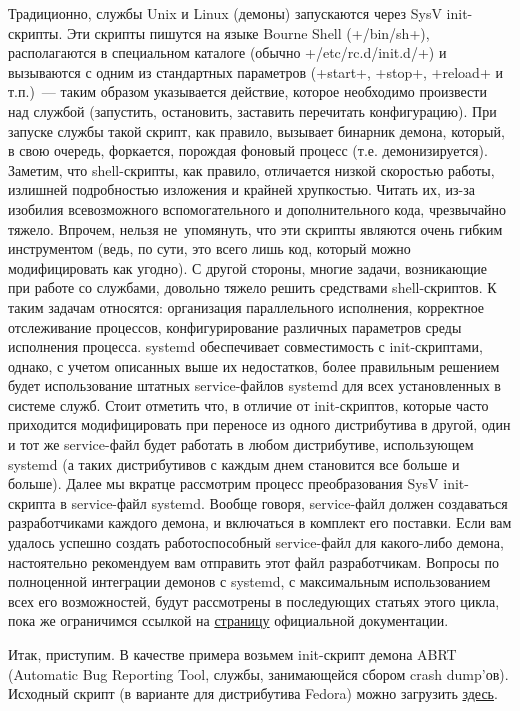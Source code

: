 \documentclass[10pt,oneside,a4paper]{article}
\begin{document}
Традиционно, службы Unix и Linux (демоны) запускаются через SysV init-скрипты.
Эти скрипты пишутся на языке Bourne Shell (+/bin/sh+), располагаются в
специальном каталоге (обычно +/etc/rc.d/init.d/+) и вызываются с одним из
стандартных параметров (+start+, +stop+, +reload+ и т.п.)~--- таким образом
указывается действие, которое необходимо произвести над службой (запустить,
остановить, заставить перечитать конфигурацию). При запуске службы такой
скрипт, как правило, вызывает бинарник демона, который, в свою очередь,
форкается, порождая фоновый процесс (т.е. демонизируется). Заметим, что
shell-скрипты, как правило, отличается низкой скоростью работы, излишней
подробностью изложения и крайней хрупкостью. Читать их, из-за изобилия
всевозможного вспомогательного и дополнительного кода, чрезвычайно тяжело.
Впрочем, нельзя не~упомянуть, что эти скрипты являются очень гибким
инструментом (ведь, по сути, это всего лишь код, который можно модифицировать
как угодно). С другой стороны, многие задачи, возникающие при работе со
службами, довольно тяжело решить средствами shell-скриптов. К таким
задачам относятся: организация параллельного исполнения, корректное
отслеживание процессов, конфигурирование различных параметров среды исполнения
процесса. systemd обеспечивает совместимость с init-скриптами, однако, с учетом
описанных выше их недостатков, более правильным решением будет использование
штатных service-файлов systemd для всех установленных в системе служб. Стоит
отметить что, в отличие от init-скриптов, которые часто приходится
модифицировать при переносе из одного дистрибутива в другой, один и тот же
service-файл будет работать в любом дистрибутиве, использующем systemd (а таких
дистрибутивов с каждым днем становится все больше и больше).  Далее мы вкратце
рассмотрим процесс преобразования SysV init-скрипта в service-файл systemd.
Вообще говоря, service-файл должен создаваться разработчиками каждого демона, и
включаться в комплект его поставки. Если вам удалось успешно создать
работоспособный service-файл для какого-либо демона, настоятельно рекомендуем
вам отправить этот файл разработчикам. Вопросы по полноценной интеграции
демонов с systemd, с максимальным использованием всех его возможностей, будут
рассмотрены в последующих статьях этого цикла, пока же ограничимся ссылкой на 
\href{http://0pointer.de/public/systemd-man/daemon.html}{страницу} официальной
документации. 

Итак, приступим. В качестве примера возьмем init-скрипт демона ABRT (Automatic
Bug Reporting Tool, службы, занимающейся сбором crash dump'ов). Исходный
скрипт (в варианте для дистрибутива Fedora) можно загрузить
\href{http://0pointer.de/public/abrtd}{здесь}.
\end{document}
